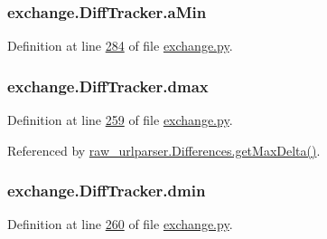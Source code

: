 \subsubsection[{\texorpdfstring{a\+Min}{aMin}}]{\setlength{\rightskip}{0pt plus 5cm}exchange.\+Diff\+Tracker.\+a\+Min}\hypertarget{classexchange_1_1_diff_tracker_a65d042348359fa27a17e092e66405ae7}{}\label{classexchange_1_1_diff_tracker_a65d042348359fa27a17e092e66405ae7}


Definition at line \hyperlink{exchange_8py_source_l00284}{284} of file \hyperlink{exchange_8py_source}{exchange.\+py}.

\subsubsection[{\texorpdfstring{dmax}{dmax}}]{\setlength{\rightskip}{0pt plus 5cm}exchange.\+Diff\+Tracker.\+dmax}\hypertarget{classexchange_1_1_diff_tracker_a8ee4999d420f124afa67ff2b131bbce5}{}\label{classexchange_1_1_diff_tracker_a8ee4999d420f124afa67ff2b131bbce5}


Definition at line \hyperlink{exchange_8py_source_l00259}{259} of file \hyperlink{exchange_8py_source}{exchange.\+py}.



Referenced by \hyperlink{raw__urlparser_8py_source_l00097}{raw\+\_\+urlparser.\+Differences.\+get\+Max\+Delta()}.

\subsubsection[{\texorpdfstring{dmin}{dmin}}]{\setlength{\rightskip}{0pt plus 5cm}exchange.\+Diff\+Tracker.\+dmin}\hypertarget{classexchange_1_1_diff_tracker_a0a1bbdbeeee705d2448d69e98f77a14c}{}\label{classexchange_1_1_diff_tracker_a0a1bbdbeeee705d2448d69e98f77a14c}


Definition at line \hyperlink{exchange_8py_source_l00260}{260} of file \hyperlink{exchange_8py_source}{exchange.\+py}.



